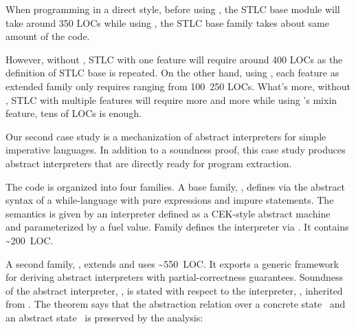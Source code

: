 

When programming in a direct style, before using \Lang, the STLC base module will take around 350 LOCs while using \Lang, the STLC base family takes about same amount of the code. 

However, without \Lang, STLC with one feature will require around 400 LOCs as the definition of STLC base is repeated. On the other hand, using \Lang, each feature as extended family only requires ranging from 100~250 LOCs. What's more, without \Lang, STLC with multiple features will require more and more while using \Lang's mixin feature, tens of LOCs is enough.


Our second case study is a mechanization of abstract interpreters
for simple imperative languages.
In addition to a soundness proof, this case study produces abstract
interpreters that are directly ready for program extraction.

The code is organized into four families.
A base family, , defines via  the abstract
syntax of a while-language with pure expressions and impure statements.
The semantics is given by an interpreter defined as a CEK-style abstract
machine~\cite{felleisen1986control} and parameterized by a fuel value.
Family  defines the interpreter via .
It contains \textasciitilde 200~LOC.

A second family, , extends  and uses
\textasciitilde 550~LOC.
It exports a generic framework for deriving
abstract interpreters with partial-correctness guarantees.
Soundness of the abstract interpreter, ,
is stated with respect to the interpreter, , inherited from .
The theorem says that the abstraction relation  over a
concrete state~ and an abstract state~ is preserved
by the analysis:

